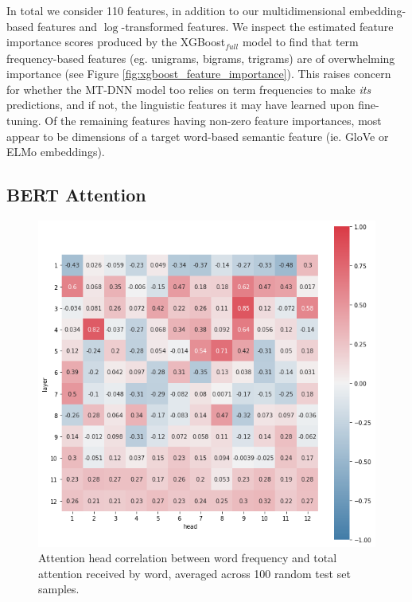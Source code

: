\documentclass[11pt,a4paper]{article}
\begin{document}
In total we consider 110 features, in addition to our multidimensional embedding-based features and $\log$-transformed features. We inspect the estimated feature importance scores produced by the XGBoost$_\textit{full}$ model to find that term frequency-based features (eg. unigrams, bigrams, trigrams) are of overwhelming importance (see Figure \ref{fig:xgboost_feature_importance}). This raises concern for whether the MT-DNN model too relies on term frequencies to make \textit{its} predictions, and if not, the linguistic features it may have learned upon fine-tuning. Of the remaining features having non-zero feature importances, most appear to be dimensions of a target word-based semantic feature (ie. GloVe or ELMo embeddings).

\subsection{BERT Attention}
\label{sec:bert_attention}

\begin{figure}
  \centering
  \includegraphics[scale=0.375]{head_correlations_tf.png}
  \captionsetup{justification=centering}
  \caption{\label{fig:head_correlations_tf} Attention head correlation between word frequency and total attention received by word, averaged across 100 random test set samples.}
\end{figure}
\end{document}
